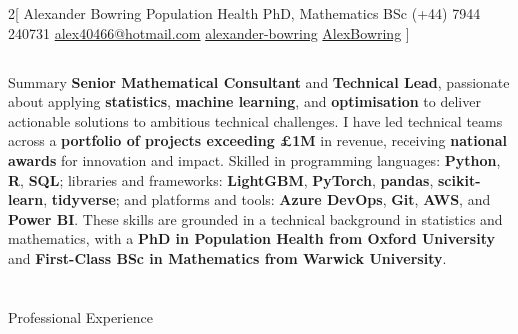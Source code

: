 \documentclass{my_cv}
\begin{document}
\begin{multicols}{2}[
    \titletext{}%
    		{Alexander Bowring}
        {Population Health PhD, Mathematics BSc}%
        {(+44) 7944 240731}%
        {\href{mailto:alex40466@hotmail.com}{alex40466@hotmail.com}}%
        {\href{https://www.linkedin.com/in/alexander-bowring/}{alexander-bowring}}%
        {\href{https://github.com/AlexBowring/}{AlexBowring}}
]

\end{multicols}

\vspace{-1.7cm}
\begin{tcolorbox}[colback=white,colframe=black,width=\dimexpr\textwidth+12mm\relax,enlarge left by=-6mm]
\section{\faStickyNote}{Summary}
\textbf{Senior Mathematical Consultant} and \textbf{Technical Lead}, passionate about applying \textbf{statistics}, \textbf{machine learning}, and \textbf{optimisation} to deliver actionable solutions to ambitious technical challenges. I have led technical teams across a \textbf{portfolio of projects exceeding £1M} in revenue, receiving \textbf{national awards} for innovation and impact. Skilled in programming languages: \textbf{Python}, \textbf{R}, \textbf{SQL}; libraries and frameworks: \textbf{LightGBM}, \textbf{PyTorch}, \textbf{pandas}, \textbf{scikit-learn}, \textbf{tidyverse}; and platforms and tools: \textbf{Azure DevOps}, \textbf{Git}, \textbf{AWS}, and \textbf{Power BI}. These skills are grounded in a technical background in statistics and mathematics, with a \textbf{PhD in Population Health from Oxford University} and \textbf{First-Class BSc in Mathematics from Warwick University}.


  
\end{tcolorbox}

\section{\faBriefcase}{Professional Experience}
\end{document}
